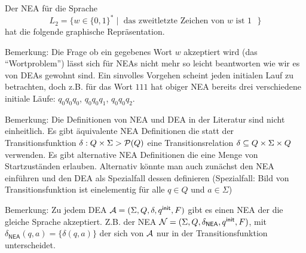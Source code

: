 \begin{Bsp}
\label{bsp:2.zweitletztes} Der NEA für die Sprache 
$$L_2=\{w\in\{0,1\}^*\mid \text{ das zweitletzte Zeichen von $w$ ist $1$ }\}$$ hat die folgende graphische Repräsentation.
  \begin{center}
  \end{center}
\end{Bsp}


Bemerkung: Die Frage ob ein gegebenes Wort $w$ akzeptiert wird (das "`Wortproblem"') lässt sich für NEAs nicht mehr so leicht beantworten wie wir es von DEAs gewohnt sind.
Ein sinvolles Vorgehen scheint jeden initialen Lauf zu betrachten, doch z.B. für das Wort $111$ hat obiger NEA bereits  drei verschiedene initiale Läufe: $q_0q_0q_0$, $q_0q_0q_1$, $q_0q_0q_2$.


Bemerkung: Die Definitionen von \ac{NEA} und \ac{DEA} in der Literatur sind nicht einheitlich. 
Es gibt äquivalente \ac{NEA} Definitionen die statt der Transitionsfunktion $\delta:Q\times\Sigma\->\mathcal{P}(Q)$ eine Transitionsrelation $\delta\subseteq Q\times\Sigma\times Q$ verwenden.
Es gibt alternative \ac{NEA} Definitionen die eine Menge von Startzuständen erlauben.
Alternativ könnte man auch zunächst den \ac{NEA} einführen und den \ac{DEA} als Spezialfall dessen definieren (Spezialfall: Bild von Transitionsfunktion ist einelementig für alle $q\in Q$ und $a\in\Sigma$)

Bemerkung: Zu jedem \ac{DEA} $\mathcal{A}= (\Sigma, Q,\delta,{q^\mathsf{init}},F)$ gibt es einen \ac{NEA} der die gleiche Sprache akzeptiert.
Z.B. der \ac{NEA} $\mathcal{N}= (\Sigma, Q,\delta_\mathsf{NEA},{q^\mathsf{init}},F)$, mit $\delta_\mathsf{NEA}(q,a)=\{\delta(q,a)\}$ der sich von $\mathcal{A}$ nur in der Transitionsfunktion unterscheidet.



